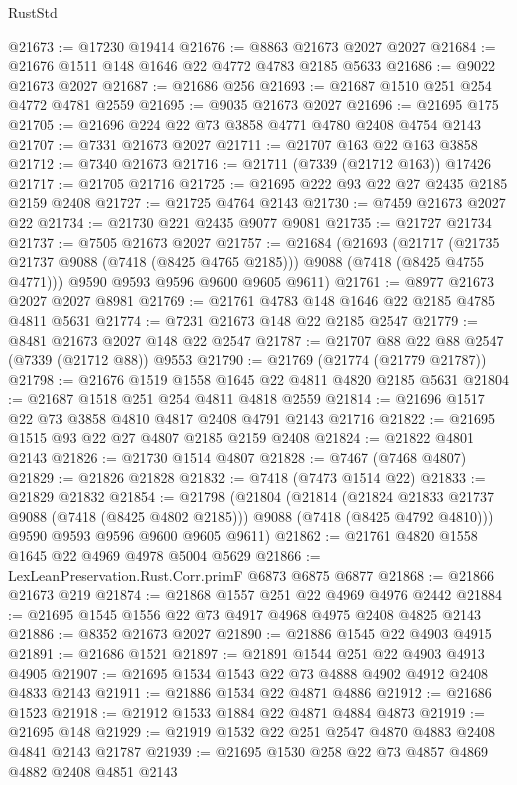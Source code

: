 \begin{lexlean}{RustStd}
\begin{coremodule}
@21673 := @17230 @19414
@21676 := @8863 @21673 @2027 @2027
@21684 := @21676 @1511 @148 @1646 @22 @4772 @4783 @2185 @5633
@21686 := @9022 @21673 @2027
@21687 := @21686 @256
@21693 := @21687 @1510 @251 @254 @4772 @4781 @2559
@21695 := @9035 @21673 @2027
@21696 := @21695 @175
@21705 := @21696 @224 @22 @73 @3858 @4771 @4780 @2408 @4754 @2143
@21707 := @7331 @21673 @2027
@21711 := @21707 @163 @22 @163 @3858
@21712 := @7340 @21673
@21716 := @21711 (@7339 (@21712 @163)) @17426
@21717 := @21705 @21716
@21725 := @21695 @222 @93 @22 @27 @2435 @2185 @2159 @2408
@21727 := @21725 @4764 @2143
@21730 := @7459 @21673 @2027 @22
@21734 := @21730 @221 @2435 @9077 @9081
@21735 := @21727 @21734
@21737 := @7505 @21673 @2027
@21757 := @21684
    (@21693
      (@21717 (@21735 @21737 @9088 (@7418 (@8425 @4765 @2185))) @9088 (@7418 (@8425 @4755 @4771)))
      @9590
      @9593
      @9596
      @9600
      @9605
      @9611)
@21761 := @8977 @21673 @2027 @2027 @8981
@21769 := @21761 @4783 @148 @1646 @22 @2185 @4785 @4811 @5631
@21774 := @7231 @21673 @148 @22 @2185 @2547
@21779 := @8481 @21673 @2027 @148 @22 @2547
@21787 := @21707 @88 @22 @88 @2547 (@7339 (@21712 @88)) @9553
@21790 := @21769 (@21774 (@21779 @21787))
@21798 := @21676 @1519 @1558 @1645 @22 @4811 @4820 @2185 @5631
@21804 := @21687 @1518 @251 @254 @4811 @4818 @2559
@21814 := @21696 @1517 @22 @73 @3858 @4810 @4817 @2408 @4791 @2143 @21716
@21822 := @21695 @1515 @93 @22 @27 @4807 @2185 @2159 @2408
@21824 := @21822 @4801 @2143
@21826 := @21730 @1514 @4807
@21828 := @7467 (@7468 @4807)
@21829 := @21826 @21828
@21832 := @7418 (@7473 @1514 @22)
@21833 := @21829 @21832
@21854 := @21798
    (@21804
      (@21814
        (@21824 @21833 @21737 @9088 (@7418 (@8425 @4802 @2185)))
        @9088
        (@7418 (@8425 @4792 @4810)))
      @9590
      @9593
      @9596
      @9600
      @9605
      @9611)
@21862 := @21761 @4820 @1558 @1645 @22 @4969 @4978 @5004 @5629
@21866 := LexLeanPreservation.Rust.Corr.primF @6873 @6875 @6877
@21868 := @21866 @21673 @219
@21874 := @21868 @1557 @251 @22 @4969 @4976 @2442
@21884 := @21695 @1545 @1556 @22 @73 @4917 @4968 @4975 @2408 @4825 @2143
@21886 := @8352 @21673 @2027
@21890 := @21886 @1545 @22 @4903 @4915
@21891 := @21686 @1521
@21897 := @21891 @1544 @251 @22 @4903 @4913 @4905
@21907 := @21695 @1534 @1543 @22 @73 @4888 @4902 @4912 @2408 @4833 @2143
@21911 := @21886 @1534 @22 @4871 @4886
@21912 := @21686 @1523
@21918 := @21912 @1533 @1884 @22 @4871 @4884 @4873
@21919 := @21695 @148
@21929 := @21919 @1532 @22 @251 @2547 @4870 @4883 @2408 @4841 @2143 @21787
@21939 := @21695 @1530 @258 @22 @73 @4857 @4869 @4882 @2408 @4851 @2143

\end{coremodule}
\end{lexlean}
